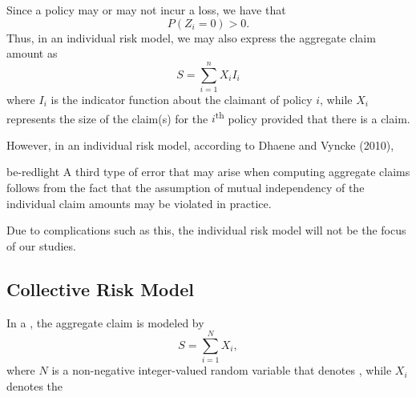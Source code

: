 \documentclass[notoc,notitlepage]{tufte-book}
\begin{document}
\begin{note}
  Since a policy may or may not incur a loss, we have that
  \begin{equation*}
    P(Z_i = 0) > 0.
  \end{equation*}
  Thus, in an individual risk model, we may also express the aggregate claim amount as
  \begin{equation*}
    S = \sum_{i=1}^{n} X_i I_i
  \end{equation*}
  where $I_i$ is the indicator function about the claimant of policy $i$, while $X_i$ represents the size of the claim(s) for the $i$\textsuperscript{th} policy provided that there is a claim.
\end{note}

However, in an individual risk model, according to Dhaene and Vyncke (2010)\cite{DhaeneVyncke2010},

\begin{quotebox}{be-red}{light}
  A third type of error that may arise when computing aggregate claims follows from the fact that the assumption of mutual independency of the individual claim amounts may be violated in practice.
\end{quotebox}

Due to complications such as this, the individual risk model will not be the focus of our studies.


\subsection{Collective Risk Model}%
\label{sub:collective_risk_model}

\begin{defn}\label{defn:collective_risk_model}
  In a , the aggregate claim is modeled by
  \begin{equation*}
    S = \sum_{i=1}^{N} X_i, \end{equation*}
  where $N$ is a non-negative integer-valued random variable that denotes , while $X_i$ denotes the 
\end{defn}
\end{document}
